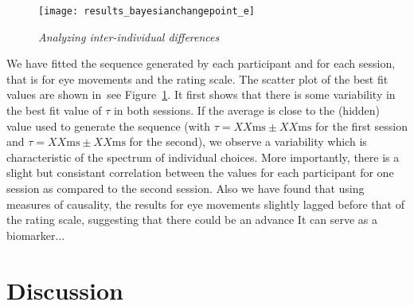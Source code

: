 \documentclass[profile,final,english, draft]{article}%
\newcommand{\ms}{\si{\milli\second}}%
\newcommand{\seeFig}[1]{see Figure~\ref{fig:#1}}
\begin{document}
\begin{figure}%
\begin{center}
    \texttt{[image: results\_bayesianchangepoint\_e]}
\end{center}
\caption{\emph{Analyzing inter-individual differences}
}
\label{fig:results_inter}
\end{figure}
We have fitted the sequence generated by each participant and
for each session, that is for eye movements and the rating scale.
The scatter plot of the best fit values are shown in~\seeFig{results_inter}.
It first shows that there is some variability in the best fit value of $\tau$
in both sessions.
If the average is close to the (hidden) value used to generate the sequence
(with $\tau = XX \ms \pm XX \ms$ for the first session and
 $\tau = XX \ms \pm XX \ms$ for the second),
 we observe a variability which is characteristic of the spectrum of individual choices.
More importantly, there is a slight but consistant
correlation between the values for each participant for one session
as compared to the second session.
Also we have found that using measures of causality,
the results for eye movements slightly lagged before
that of the rating scale,
suggesting that there could be an advance
It can serve as a biomarker...


\section{Discussion}
\end{document}
